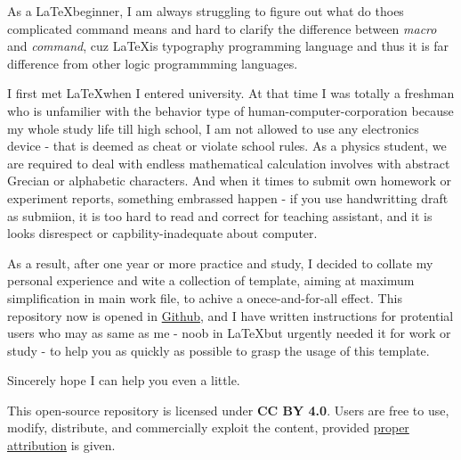     As a \LaTeX beginner, I am always struggling  to figure out what do thoes complicated command means and hard to clarify the difference between \emph{macro} and \emph{command}, cuz \LaTeX is typography programming language and thus it is far difference from other logic programmming languages. 

    I first met \LaTeX when I entered university. At that time I was totally a freshman who is unfamilier with the behavior type of human-computer-corporation because my whole study life till high school, I am not allowed to use any electronics device - that is deemed as cheat or violate school rules. As a physics student, we are required to deal with endless mathematical calculation involves with abstract Grecian or alphabetic characters. And when it times to submit own homework or experiment reports, something embrassed happen - if you use handwritting draft as submiion, it is too hard to read and correct for teaching assistant, and it is looks disrespect or capbility-inadequate about computer. 
    
    As a result, after one year or more practice and study, I decided to collate my personal experience and wite a collection of template, aiming at maximum simplification in main work file, to achive a onece-and-for-all effect. This repository now is opened in \href{https://github.com/SweetPastry/spTemplate}{Github}, and I have written instructions for protential users who may as same as me - noob in \LaTeX but urgently needed it for work or study - to help you as quickly as possible to grasp the usage of this template.

    Sincerely hope I can help you even a little. 
    
    This open-source repository is licensed under \textbf{CC BY 4.0}. Users are free to use, modify, distribute, and commercially exploit the content, provided \href{https://github.com/SweetPastry/spTemplate/blob/main/LICENSE}{proper attribution} is given.
